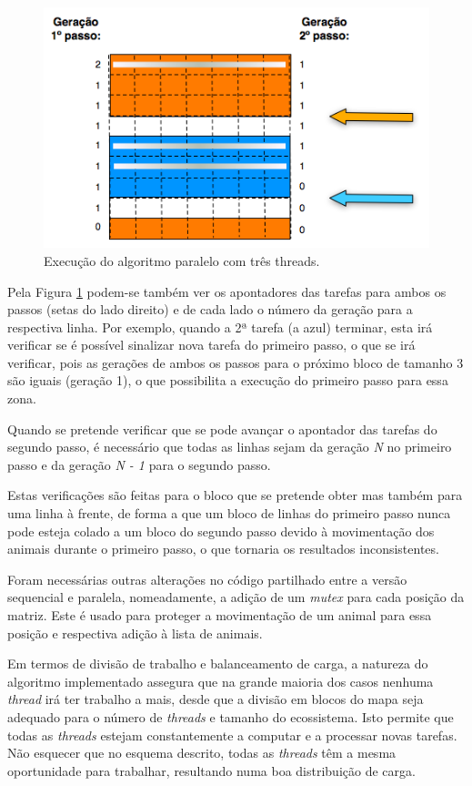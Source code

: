 \documentclass[12pt]{article}
\begin{document}
\begin{figure}[ht]
  \centering
    \includegraphics[scale=0.8]{diagrama_evolucao.png}
  \caption{Execução do algoritmo paralelo com três threads.}
  \label{fig:evolucao}
\end{figure}

Pela Figura \ref{fig:evolucao} podem-se também ver os apontadores das tarefas para ambos os passos (setas do lado direito)
e de cada lado o número da geração para a respectiva linha. Por exemplo, quando a 2ª tarefa (a azul) terminar,
esta irá verificar se é possível sinalizar nova tarefa do primeiro passo, o que se irá verificar,
pois as gerações de ambos os passos para o próximo bloco de tamanho 3 são iguais (geração 1), o que possibilita
a execução do primeiro passo para essa zona. 

Quando se pretende verificar que se pode avançar o apontador das tarefas do segundo passo, é necessário
que todas as linhas sejam da geração \textit{N} no primeiro passo e da geração \textit{N - 1} para o segundo
passo.

Estas verificações são feitas para o bloco que se pretende obter mas também para uma linha à frente, de forma
a que um bloco de linhas do primeiro passo nunca pode esteja colado a um bloco do segundo passo devido à
movimentação dos animais durante o primeiro passo, o que tornaria os resultados inconsistentes.

Foram necessárias outras alterações no código partilhado entre a versão sequencial e paralela, nomeadamente,
a adição de um \textit{mutex} para cada posição da matriz. Este é usado para proteger a movimentação
de um animal para essa posição e respectiva adição à lista de animais.

Em termos de divisão de trabalho e balanceamento de carga, a natureza do algoritmo implementado
assegura que na grande maioria dos casos nenhuma \textit{thread} irá ter trabalho a mais,
desde que a divisão em blocos do mapa seja adequado para o número de \textit{threads} e tamanho do ecossistema.
Isto permite que todas as \textit{threads} estejam constantemente a computar e a processar
novas tarefas. Não esquecer que no esquema descrito, todas as \textit{threads} têm a mesma oportunidade
para trabalhar, resultando numa boa distribuição de carga.
\end{document}

